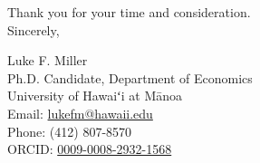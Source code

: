 \documentclass[12pt]{article}
\begin{document}
\noindent
Thank you for your time and consideration.\\


\noindent
Sincerely,

\vspace{1em}

\noindent
Luke F. Miller \\
Ph.D. Candidate, Department of Economics \\
University of Hawaiʻi at Mānoa \\
Email: \href{mailto:lukefm@hawaii.edu}{lukefm@hawaii.edu} \\
Phone: (412) 807-8570 \\
ORCID: \href{https://orcid.org/0009-0008-2932-1568}{0009-0008-2932-1568}
\end{document}
